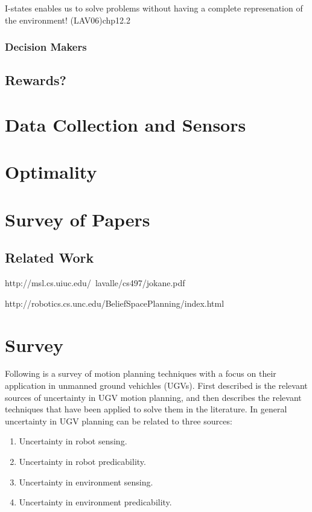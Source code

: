 I-states enables us to solve problems without having a complete represenation of
the environment! (LAV06)chp12.2



\subsubsection{Decision Makers}

\subsection{Rewards?}

\section{Data Collection and Sensors}



\section{Optimality}



\section{Survey of Papers}

\subsection{Related Work}

http://msl.cs.uiuc.edu/~lavalle/cs497/jokane.pdf

http://robotics.cs.unc.edu/BeliefSpacePlanning/index.html

\section{Survey}

Following is a survey of motion planning techniques with a focus on their
application in unmanned ground vehichles (UGVs). First described is the relevant
sources of uncertainty in UGV motion planning, and then describes the relevant
techniques that have been applied to solve them in the literature. In general
uncertainty in UGV planning can be related to three sources:
\begin{enumerate}
\item Uncertainty in robot sensing.
\item Uncertainty in robot predicability.
\item Uncertainty in environment sensing.
\item Uncertainty in environment predicability.
\end{enumerate}
\cite{lavalleFrameworkMotionPlanning1995}

